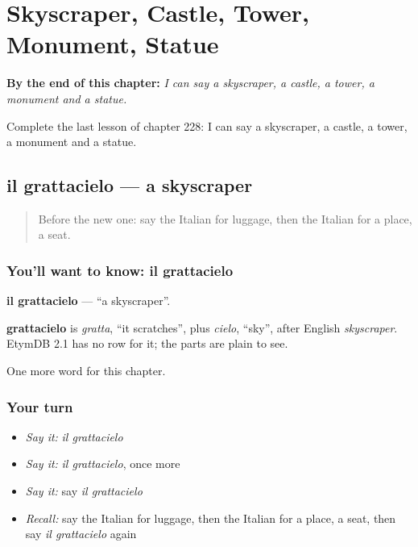 
\chapter{Skyscraper, Castle, Tower, Monument, Statue}
\label{ch:it-skyscraper-castle-tower-monument-statue}

\begin{chapteropening}
\textbf{By the end of this chapter:} \emph{I can say a skyscraper, a castle, a tower, a monument and a statue.}

Complete the last lesson of chapter 228: I can say a skyscraper, a castle, a tower, a monument and a statue.
\end{chapteropening}

\section[il grattacielo]{il grattacielo — a skyscraper}

\label{lesson:IT-C228-grattacielo}



\begin{quote}
Before the new one: say the Italian for luggage, then the Italian for a place, a seat.
\end{quote}

\subsection*{You'll want to know: il grattacielo}
\textbf{il grattacielo} — \textquotedblleft{}a skyscraper\textquotedblright{}.

\begin{cousinweb}
\textbf{grattacielo} is \emph{gratta}, \textquotedblleft{}it scratches\textquotedblright{}, plus \emph{cielo}, \textquotedblleft{}sky\textquotedblright{}, after English \emph{skyscraper}. EtymDB 2.1 has no row for it; the parts are plain to see.
\end{cousinweb}

\begin{grammarlens}[title={What you've built}]
One more word for this chapter.
\end{grammarlens}

\subsection*{Your turn}
\begin{itemize}
\raggedright
  \item \emph{Say it:} \emph{il grattacielo}
  \item \emph{Say it:} \emph{il grattacielo}, once more
  \item \emph{Say it:} say \emph{il grattacielo}
  \item \emph{Recall:} say the Italian for luggage, then the Italian for a place, a seat, then say \emph{il grattacielo} again
\end{itemize}

